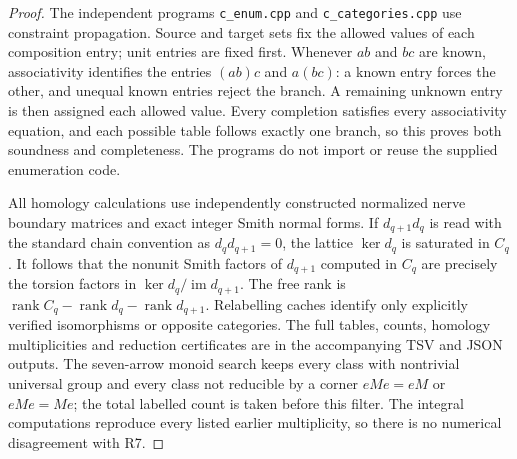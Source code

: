 \begin{proof}
The independent programs \texttt{c\_enum.cpp} and
\texttt{c\_categories.cpp} use constraint propagation. Source and target
sets fix the allowed values of each composition entry; unit entries are
fixed first. Whenever $ab$ and $bc$ are known, associativity identifies
the entries $(ab)c$ and $a(bc)$: a known entry forces the other, and
unequal known entries reject the branch. A remaining unknown entry is
then assigned each allowed value. Every completion satisfies every
associativity equation, and each possible table follows exactly one
branch, so this proves both soundness and completeness. The programs do
not import or reuse the supplied enumeration code.

All homology calculations use independently constructed normalized nerve
boundary matrices and exact integer Smith normal forms. If
$d_{q+1}d_q$ is read with the standard chain convention as
$d_qd_{q+1}=0$, the lattice $\ker d_q$ is saturated in $C_q$.
It follows that the nonunit Smith factors of $d_{q+1}$ computed in
$C_q$ are precisely the torsion factors in
$\ker d_q/\operatorname{im}d_{q+1}$. The free rank is
$\operatorname{rank}C_q-\operatorname{rank}d_q-
\operatorname{rank}d_{q+1}$. Relabelling caches identify only explicitly
verified isomorphisms or opposite categories. The full tables, counts,
homology multiplicities and reduction certificates are in the accompanying
TSV and JSON outputs. The seven-arrow monoid search keeps every class
with nontrivial universal group and every class not reducible by a corner
$eMe=eM$ or $eMe=Me$; the total labelled count is taken before this filter.
The integral computations reproduce every listed earlier multiplicity,
so there is no numerical disagreement with R7.
\end{proof}

